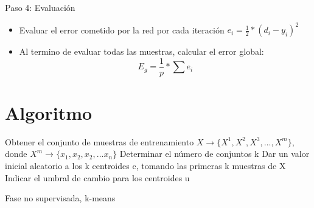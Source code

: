 \documentclass[
	11pt, %
]{beamer}
\begin{document}
\begin{frame}
  Paso 4: Evaluación
  
  \bigskip %

  \begin{itemize}
  \item Evaluar el error cometido por la red por cada iteración $e_{i} = \frac{1}{2}*(d_{i}-y_{i})^{2}$

    \bigskip %
    
  \item Al termino de evaluar todas las muestras, calcular el error global:
    \[ E_{g} = \frac{1}{p} * \sum e_{i}\]
  \end{itemize}
\end{frame}

\section{Algoritmo}
\begin{frame}
  \begin{algorithm}[H]
  \scriptsize
    \SetAlgoLined
    Obtener el conjunto de muestras de entrenamiento $X \rightarrow \{X^1,X^2,X^3,...,X^m\}$, donde $X^{m} \rightarrow \{x_1,x_2,x_2,...x_n\}$\;
    Determinar el número de conjuntos k\;
    Dar un valor inicial aleatorio a los k centroides c, tomando las primeras k muestras de X\;
    Indicar el umbral de cambio para los centroides u\;
    \caption{Fase no supervisada, k-means}
  \end{algorithm}
\end{frame}
\end{document}
